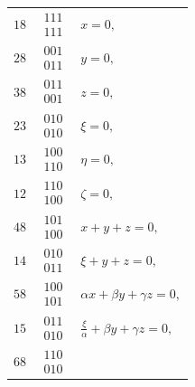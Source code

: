 \documentclass[11pt]{article}
\begin{document}
\medskip
\begin{center}
\begin{tabular}{c l l}
$18$ & $\begin{smallmatrix}111\\111\end{smallmatrix}$ & $x = 0,$\\[3pt]
$28$ & $\begin{smallmatrix}001\\011\end{smallmatrix}$ & $y = 0,$\\[3pt]
$38$ & $\begin{smallmatrix}011\\001\end{smallmatrix}$ & $z = 0,$\\[3pt]
$23$ & $\begin{smallmatrix}010\\010\end{smallmatrix}$ & $\xi = 0,$\\[3pt]
$13$ & $\begin{smallmatrix}100\\110\end{smallmatrix}$ & $\eta = 0,$\\[3pt]
$12$ & $\begin{smallmatrix}110\\100\end{smallmatrix}$ & $\zeta = 0,$\\[3pt]
$48$ & $\begin{smallmatrix}101\\100\end{smallmatrix}$ & $x + y + z = 0,$\\[3pt]
$14$ & $\begin{smallmatrix}010\\011\end{smallmatrix}$ & $\xi + y + z = 0,$\\[3pt]
$58$ & $\begin{smallmatrix}100\\101\end{smallmatrix}$ & $\alpha x + \beta y + \gamma z = 0,$\\[3pt]
$15$ & $\begin{smallmatrix}011\\010\end{smallmatrix}$ & $\tfrac{\xi}{\alpha} + \beta y + \gamma z = 0,$\\[3pt]
$68$ & $\begin{smallmatrix}110\\010\end{smallmatrix}$ & \\[3pt]

\end{tabular}
\end{center}
\end{document}
